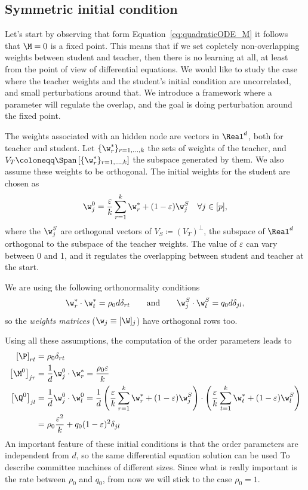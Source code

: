 \subsection{Symmetric initial condition}
Let's start by observing that form Equation~\eqref{eq:quadraticODE_M} it follows
that \(\M=0\) is a fixed point. This means that if we set copletely non-overlapping
weights between student and teacher, then there is no learning at all, at least 
from the point of view of differential equations.
We would like to study the case where the teacher weights and the student's initial condition are uncorrelated,
and small perturbations around that. We introduce a framework where a parameter will
regulate the overlap, and the goal is doing perturbation around the fixed point.

The weights associated with an hidden node are vectors in \(\Real^d\), both for teacher and student.
Let \(\{\w^*_r\}_{r=1,\dots,k}\) the sets of weights of the teacher,
and \(V_T \coloneqq \Span\left[\{\w^*_r\}_{r=1,\dots,k}\right]\) the subspace generated by them.
We also assume these weights to be orthogonal. The initial weights for the student are chosen as
\[
    \w_j^0 = \frac{\varepsilon}{k} \sum_{r=1}^k \w^*_r + (1-\varepsilon) \w_j^S \quad
    \forall j\in [p],
\]
where the \(\w_j^S\) are orthogonal vectors of \(V_S \coloneqq (V_T)^\bot\),
the subspace of \(\Real^d\) orthogonal to the subspace of the teacher weights. 
The value of \(\varepsilon\) can vary between 0 and 1,
and it regulates the overlapping between student and teacher at the start.

We are using the following orthonormality conditions
\[
  \w^*_r \cdot \w^*_t = \rho_0d\delta_{rt}
  \qquad\text{and}\qquad
  \w_j^S\cdot\w_l^S=q_0d\delta_{jl},
\]
so the \emph{weights matrices} (\(\w_j \equiv [\W]_j\)) have orthogonal rows too.

Using all these assumptions, the computation of the order parameters leads to
\begin{align*}
  \left[\P\right]_{rt} &= \rho_0\delta_{rt}\\
  \left[\M^0\right]_{jr} &= \frac1d \w_j^0 \cdot \w^*_r = \frac{\rho_0\varepsilon}{k} \\
  \left[\Q^0\right]_{jl} &= \frac1d \w_j^0 \cdot \w^0_l = \frac1d
    \left(\frac{\varepsilon}{k} \sum_{r=1}^k \w^*_r + (1-\varepsilon) \w_j^S\right)\cdot
    \left(\frac{\varepsilon}{k} \sum_{t=1}^k \w^*_t + (1-\varepsilon) \w_l^S\right)\\
      &= \rho_0\frac{\varepsilon^2}{k} + q_0(1-\varepsilon)^2 \delta_{jl}
\end{align*}
An important feature of these initial conditions is that the order parameters are 
independent from \(d\), so the same differential equation solution can be used To
describe committee machines of different sizes.
Since what is really important is the rate between \(\rho_0\) and \(q_0\),
from now we will stick to the case \(\rho_0 = 1\).

